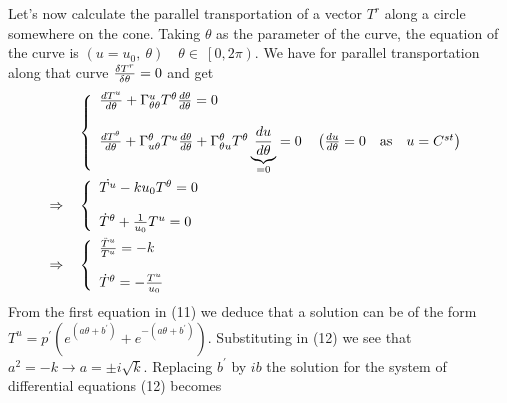 Let's now calculate the parallel transportation of a vector $T^r$ along a circle somewhere on the cone. Taking $\theta$ as the parameter of the curve, the equation of the curve is $(u=u_0,\ \theta) \quad \theta \in \ \left[0, 2\pi \right)$. We have for parallel transportation along that curve $\fdv{T^r}{\theta}=0$ and get
\begin{align}
 & \left \{ \begin{array}{l}
\dv{T^u}{\theta} + \Gamma^u_{\theta \theta}T^{\theta}\dv{\theta}{\theta} =0\\\\
\dv{T^{\theta}}{\theta} + \Gamma^{\theta}_{u \theta}T^{u}\dv{\theta}{\theta}+ \Gamma^{\theta}_{\theta u}T^{\theta}\underbrace{\dv{u}{\theta}}_{=0} =0\quad \left(\dv{u}{\theta} = 0 \quad \text{as} \quad u= C^{st} \right)
\end{array} \right.\\
\Rightarrow \quad
 & \left \{ \begin{array}{l}
\dot{T^u} -ku_0 T^{\theta}=0\\\\
\dot{T}^{\theta} + \frac{1}{u_0}T^{u}=0
\end{array} \right.\\
\Rightarrow \quad
 & \left \{ \begin{array}{l}
\frac{\ddot{T}^u}{T^{u}} = -k\\\\
\dot{T}^{\theta} =- \frac{T^{u}}{u_0}
\end{array} \right.
\end{align}
From the first equation in (11) we deduce that a solution can be of the form\\ $T^u = p^{'}\left( e^{(a \theta + b^{'})}+ e^{-(a \theta + b^{'})}\right)$. Substituting in (12) we see that $a^2 = -k \rightarrow a = \pm i\sqrt{k}$. Replacing $b^{'}$ by $ib$ the solution for the system of differential equations (12) becomes
